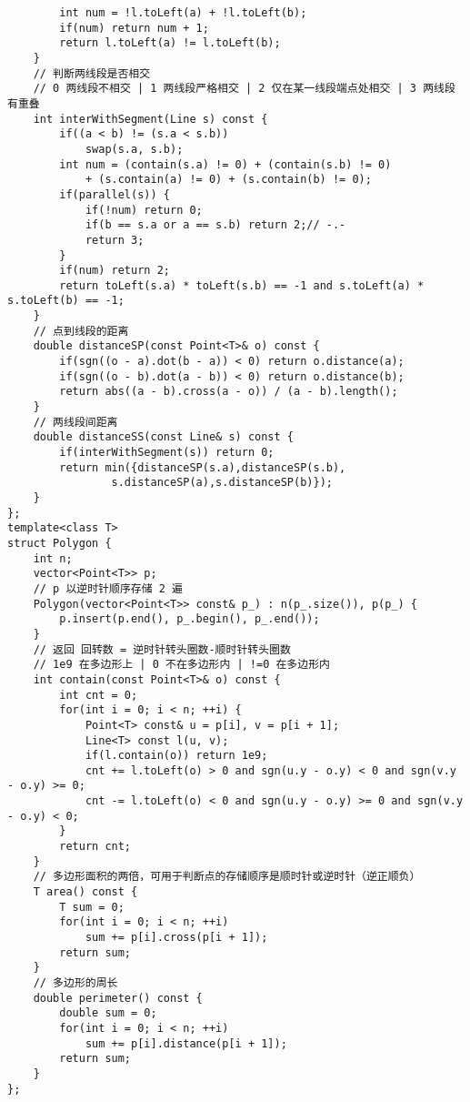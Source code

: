 \begin{lstlisting}
        int num = !l.toLeft(a) + !l.toLeft(b);
        if(num) return num + 1;
        return l.toLeft(a) != l.toLeft(b);
    }
    // 判断两线段是否相交
    // 0 两线段不相交 | 1 两线段严格相交 | 2 仅在某一线段端点处相交 | 3 两线段有重叠
    int interWithSegment(Line s) const {
        if((a < b) != (s.a < s.b))
            swap(s.a, s.b);
        int num = (contain(s.a) != 0) + (contain(s.b) != 0)
            + (s.contain(a) != 0) + (s.contain(b) != 0);
        if(parallel(s)) {
            if(!num) return 0;
            if(b == s.a or a == s.b) return 2;// -.-
            return 3;
        }
        if(num) return 2;
        return toLeft(s.a) * toLeft(s.b) == -1 and s.toLeft(a) * s.toLeft(b) == -1;
    }
    // 点到线段的距离
    double distanceSP(const Point<T>& o) const {
        if(sgn((o - a).dot(b - a)) < 0) return o.distance(a);
        if(sgn((o - b).dot(a - b)) < 0) return o.distance(b);
        return abs((a - b).cross(a - o)) / (a - b).length();
    }
    // 两线段间距离
    double distanceSS(const Line& s) const {
        if(interWithSegment(s)) return 0;
        return min({distanceSP(s.a),distanceSP(s.b),
                s.distanceSP(a),s.distanceSP(b)});
    }
};
template<class T>
struct Polygon {
    int n;
    vector<Point<T>> p;
    // p 以逆时针顺序存储 2 遍
    Polygon(vector<Point<T>> const& p_) : n(p_.size()), p(p_) {
        p.insert(p.end(), p_.begin(), p_.end());
    }
    // 返回 回转数 = 逆时针转头圈数-顺时针转头圈数
    // 1e9 在多边形上 | 0 不在多边形内 | !=0 在多边形内
    int contain(const Point<T>& o) const {
        int cnt = 0;
        for(int i = 0; i < n; ++i) {
            Point<T> const& u = p[i], v = p[i + 1];
            Line<T> const l(u, v);
            if(l.contain(o)) return 1e9;
            cnt += l.toLeft(o) > 0 and sgn(u.y - o.y) < 0 and sgn(v.y - o.y) >= 0;
            cnt -= l.toLeft(o) < 0 and sgn(u.y - o.y) >= 0 and sgn(v.y - o.y) < 0;
        }
        return cnt;
    }
    // 多边形面积的两倍，可用于判断点的存储顺序是顺时针或逆时针（逆正顺负）
    T area() const {
        T sum = 0;
        for(int i = 0; i < n; ++i)
            sum += p[i].cross(p[i + 1]);
        return sum;
    }
    // 多边形的周长
    double perimeter() const {
        double sum = 0;
        for(int i = 0; i < n; ++i)
            sum += p[i].distance(p[i + 1]);
        return sum;
    }
};


\end{lstlisting}
